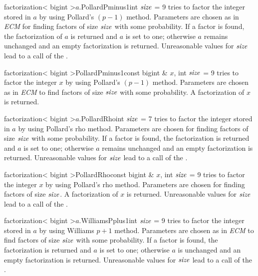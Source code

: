 \begin{fcode}{factorization< bigint >}{$a$.PollardPminus1}{int $\mathit{size}$ = 9}
  tries to factor the integer stored in $a$ by using Pollard's $(p-1)$ method.  Parameters are
  chosen as in \emph{ECM} for finding factors of size $\mathit{size}$ with some probability.  If a
  factor is found, the factorization of $a$ is returned and $a$ is set to one; otherwise $a$
  remains unchanged and an empty factorization is returned.  Unreasonable values for $\mathit{size}$
  lead to a call of the \LEH.
\end{fcode}

\begin{fcode}{factorization< bigint >}{PollardPminus1}{const bigint & $x$, int $\mathit{size}$ = 9}  
  tries to factor the integer $x$ by using Pollard's $(p-1)$ method.  Parameters are chosen as in
  \emph{ECM} to find factors of size $\mathit{size}$ with some probability.  A factorization of $x$
  is returned.
\end{fcode}

\begin{fcode}{factorization< bigint >}{$a$.PollardRho}{int $\mathit{size}$ = 7}
  tries to factor the integer stored in $a$ by using Pollard's rho method.  Parameters are
  chosen for finding factors of size $\mathit{size}$ with some probability.  If a factor is found, the
  factorization is returned and $a$ is set to one; otherwise $a$ remains unchanged and an empty
  factorization is returned.  Unreasonable values for $\mathit{size}$ lead to a call of the \LEH.
\end{fcode}

\begin{fcode}{factorization< bigint >}{PollardRho}{const bigint & $x$, int $\mathit{size}$ = 9}
  tries to factor the integer $x$ by using Pollard's rho method.  Parameters are chosen for
  finding factors of size $\mathit{size}$.  A factorization of $x$ is returned.  Unreasonable values
  for $\mathit{size}$ lead to a call of the \LEH.
\end{fcode}

\begin{fcode}{factorization< bigint >}{$a$.WilliamsPplus1}{int $\mathit{size}$ = 9}
  tries to factor the integer stored in $a$ by using Williams $p+1$ method.  Parameters are
  chosen as in \emph{ECM} to find factors of size $\mathit{size}$ with some probability.  If a
  factor is found, the factorization is returned and $a$ is set to one; otherwise $a$ is
  unchanged and an empty factorization is returned.  Unreasonable values for $\mathit{size}$ lead to
  a call of the \LEH.
\end{fcode}

